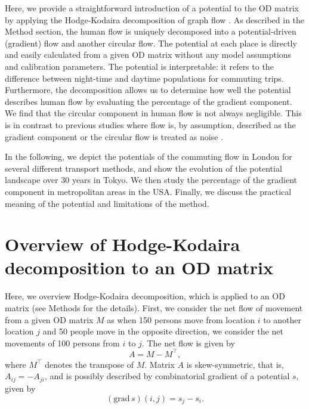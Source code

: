 \documentclass[]{article}
\begin{document}
%
Here, we provide a straightforward introduction of a potential to the OD matrix by applying the Hodge-Kodaira decomposition of graph flow \cite{DeRham1984,hodge1989theory,Jiang2011,Kodaira1949,Warner1983}.
As described in the Method section, the human flow is uniquely decomposed into a potential-driven (gradient) flow and another circular flow.
The potential at each place is directly and easily calculated from a given OD matrix
without any model assumptions and calibration parameters.
%
The potential is interpretable: it refers to the difference between night-time and daytime populations for commuting trips.
Furthermore, the decomposition allows us to determine how well the potential describes human flow by evaluating the percentage of the gradient component.
We find that the circular component in human flow is not always negligible.
This is in contrast to  previous studies where flow is, by assumption, described as the gradient component \cite{Stewart1947} or the circular flow is treated as noise \cite{Mazzoli2019b}.


%
In the following, we depict the potentials of the commuting flow in London for several different transport methods,
and show the evolution of the potential landscape over 30 years in Tokyo. 
We then study the percentage of the gradient component in metropolitan areas in the USA. 
Finally, we discuss the practical meaning of the potential and limitations of the method.


\section*{Overview of Hodge-Kodaira decomposition to an OD matrix}
Here, we overview  Hodge-Kodaira decomposition, which is applied to an OD matrix (see Methods for the details).
First, we consider the net flow of movement from a given  OD matrix $M$ as
when 150 persons move from location $i$ to another location $j$ and 50 people move in the opposite direction, we consider the net movements of 100 persons from $i$ to $j$.
The net flow is given by
\begin{equation}
  A = M - M^{\intercal}, \label{eq:netflow}
\end{equation}
where $M^{\intercal}$ denotes the transpose of $M$.
Matrix $A$ is skew-symmetric, that is, $A_{ij} = - A_{ji}$,
and is possibly described by combinatorial gradient of a potential $s$, given by
\begin{equation}
  (\text{grad}\, s)(i, j) =  s_j-s_i.
\end{equation}
\end{document}
